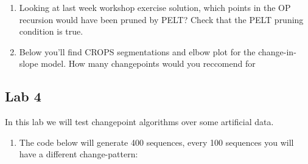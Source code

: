 \documentclass[
  letterpaper,
  DIV=11,
  numbers=noendperiod]{scrreprt}
\providecommand{\tightlist}{%
  \setlength{\itemsep}{0pt}\setlength{\parskip}{0pt}}\usepackage{longtable,booktabs,array}
\begin{document}
\begin{enumerate}
\def\labelenumi{\arabic{enumi}.}
\item
  Looking at last week workshop exercise solution, which points in the
  OP recursion would have been pruned by PELT? Check that the PELT
  pruning condition is true.
\item
  Below you'll find CROPS segmentations and elbow plot for the
  change-in-slope model. How many changepoints would you reccomend for
\end{enumerate}

\subsection{Lab 4}\label{lab-4}

In this lab we will test changepoint algorithms over some artificial
data.

\begin{enumerate}
\def\labelenumi{\arabic{enumi}.}
\tightlist
\item
  The code below will generate 400 sequences, every 100 sequences you
  will have a different change-pattern:
\end{enumerate}
\end{document}
